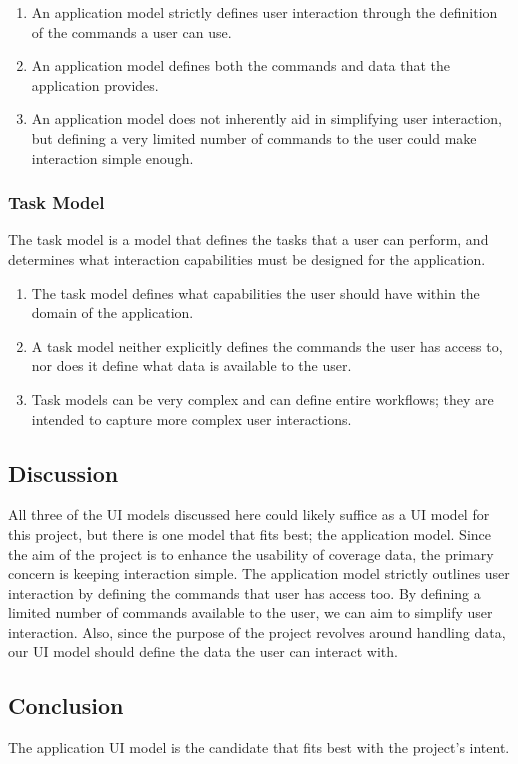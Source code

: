 \documentclass[onecolumn, draftclsnofoot,10pt, compsoc]{IEEEtran}
\begin{document}
\begin{enumerate}
\item An application model strictly defines user interaction through the definition of the commands a user can use.
\item An application model defines both the commands and data that the application provides.
\item An application model does not inherently aid in simplifying user interaction, but defining a very limited number of commands to the user could make interaction simple enough.
\end{enumerate}

\subsubsection{Task Model}
The task model is a model that defines the tasks that a user can perform, and determines what interaction capabilities must be designed for the application.

\begin{enumerate}
\item The task model defines what capabilities the user should have within the domain of the application.
\item A task model neither explicitly defines the commands the user has access to, nor does it define what data is available to the user.
\item Task models can be very complex and can define entire workflows; they are intended to capture more complex user interactions.
\end{enumerate}

\subsection{Discussion}
All three of the UI models discussed here could likely suffice as a UI model for this project, but there is one model that fits best; the application model. Since the aim of the project is to enhance the usability of coverage data, the primary concern is keeping interaction simple. The application model strictly outlines user interaction by defining the commands that user has access too. By defining a limited number of commands available to the user, we can aim to simplify user interaction. Also, since the purpose of the project revolves around handling data, our UI model should define the data the user can interact with.

\subsection{Conclusion}
The application UI model is the candidate that fits best with the project’s intent.
\end{document}
